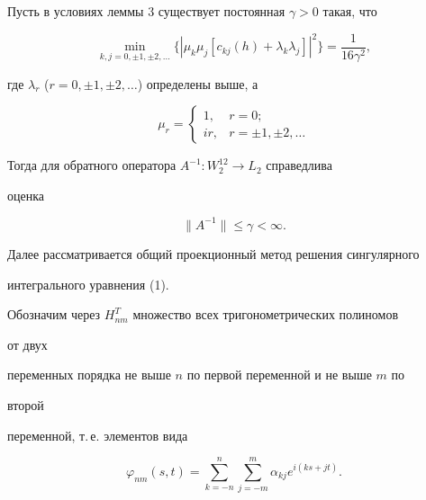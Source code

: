  


\begin{cornonum} 


Пусть в условиях леммы 3 существует постоянная $\gamma>0$ такая, что 


$$ 


\min_{k,j=0,\pm1,\pm2,\dotsc}\{|\mu_k\mu_j[c_{k j}(h)+ 


\lambda_k\lambda_j]|^2\}=\frac{1}{16\gamma^2},


$$ 


где $\lambda_r$ ($r=0,\pm1,\pm2,\dotsc$) определены выше, а 


$$ 


\mu_r= 


\begin{cases} 


1, & r=0;\\ 


i r, & r=\pm1,\pm2,\dotsc 


\end{cases} 


$$ 


Тогда для обратного оператора $A^{-1}:W^{12}_2\to L_2$ справедлива 


оценка 


$$ 


\|A^{-1}\|\le\gamma<\infty. 


$$ 


\end{cornonum} 


 


Далее рассматривается общий проекционный метод решения сингулярного 


интегрального уравнения (1). 





Обозначим через $H^T_{nm}$ множество всех тригонометрических полиномов 


от двух 


переменных порядка не выше $n$ по первой переменной и не выше $m$ по 


второй 


переменной, т.\,е. элементов вида 


\begin{equation} 


\varphi_{nm}(s,t)=\sum^n_{k=-n}\sum^m_{j=-m} 


\alpha_{k j}e^{i(k s+j t)}. 


\end{equation} 


